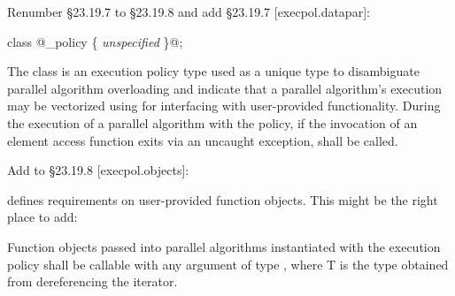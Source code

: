 Renumber §23.19.7 to §23.19.8 and add §23.19.7 [execpol.datapar]:
\begin{wgText}
  \color{WgAdd}
  \begin{itemdecl}
class @\datapar{}_policy \{ \textit{unspecified} \}@;
  \end{itemdecl}
  \begin{itemdescr}
    \pnum The class \datapar[_policy] is an execution policy type used as a unique type to disambiguate parallel algorithm overloading and indicate that a parallel algorithm's execution may be vectorized using \datapar for interfacing with user-provided functionality.
    \pnum During the execution of a parallel algorithm with the \dataparEPT policy, if the invocation of an element access function exits via an uncaught exception,  shall be called.
  \end{itemdescr}
\end{wgText}

Add to §23.19.8 [execpol.objects]:
\begin{wgText}
  \ttfamily{}
\end{wgText}

\citep[§28.4.2]{N4659} defines requirements on user-provided function objects.
This might be the right place to add:
\begin{wgText}
  \addtocounter{Paras}{1}
  \color{WgAdd}
  \pnum Function objects passed into parallel algorithms instantiated with the \dataparEP execution policy shall be callable with any argument of type \datapar[<T, Abi>], where \type T is the type obtained from dereferencing the iterator.
\end{wgText}

